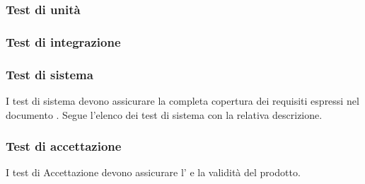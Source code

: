 \subsubsection{Test di unità}


\newpage

\newpage

\subsubsection{Test di integrazione}


\newpage

\newpage

\subsubsection{Test di sistema}
I test di sistema devono assicurare la completa copertura dei requisiti espressi nel documento \AdR{}.
Segue l'elenco dei test di sistema con la relativa descrizione.


\newpage

\newpage

\subsubsection{Test di accettazione}
I test di Accettazione devono assicurare l' e la validità del prodotto.


\newpage

